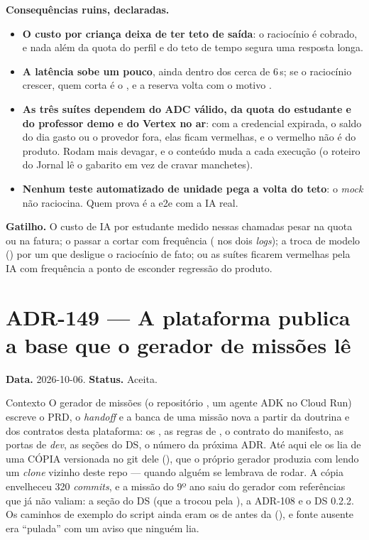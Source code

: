 \textbf{Consequências ruins, declaradas.}

\begin{itemize}
  \item \textbf{O custo por criança deixa de ter teto de saída}: o raciocínio é
    cobrado, e nada além da quota do perfil e do teto de tempo segura uma
    resposta longa.
  \item \textbf{A latência sobe um pouco}, ainda dentro dos cerca de 6\,s; se
    o raciocínio crescer, quem corta é o , e a reserva volta
    com o motivo .
  \item \textbf{As três suítes dependem do ADC válido, da quota do estudante e
    do professor demo e do Vertex no ar}: com a credencial expirada, o saldo
    do dia gasto ou o provedor fora, elas ficam vermelhas, e o vermelho não é
    do produto. Rodam mais devagar, e o conteúdo muda a cada execução (o
    roteiro do Jornal lê o gabarito em vez de cravar manchetes).
  \item \textbf{Nenhum teste automatizado de unidade pega a volta do teto}: o
    \emph{mock} não raciocina. Quem prova é a e2e com a IA real.
\end{itemize}

\textbf{Gatilho.} O custo de IA por estudante medido nessas chamadas pesar na
quota ou na fatura; o  passar a cortar com frequência
( nos dois \emph{logs}); a troca de modelo
() por um que desligue o raciocínio de fato; ou as suítes
ficarem vermelhas pela IA com frequência a ponto de esconder regressão do
produto.

\section{ADR-149 --- A plataforma publica a base que o gerador de missões lê}
\label{adr:base-do-gerador}

\textbf{Data.} 2026-10-06. \textbf{Status.} Aceita.

\begin{especificacao}{Contexto}
O gerador de missões (o repositório , um agente ADK no
Cloud Run) escreve o PRD, o \emph{handoff} e a banca de uma missão nova a
partir da doutrina e dos contratos desta plataforma: os , as
regras de , o contrato do manifesto, as portas de
\emph{dev}, as seções do DS, o número da próxima ADR. Até aqui ele os lia de
uma CÓPIA versionada no git dele (),
que o próprio gerador produzia com 
lendo um \emph{clone} vizinho deste repo --- quando alguém se lembrava de
rodar. A cópia envelheceu 320 \emph{commits}, e a missão do 9º ano saiu do
gerador com referências que já não valiam: a seção  do DS (que a
 trocou pela ), a ADR-108 e o DS 0.2.2. Os
caminhos de exemplo do script ainda eram os de antes da 
(), e fonte ausente era \enquote{pulada} com um aviso
que ninguém lia.
\end{especificacao}

